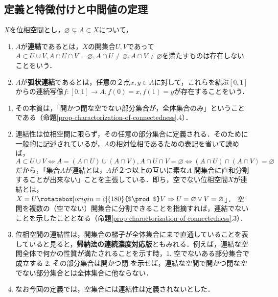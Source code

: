 \documentclass[uplatex,dvipdfmx]{jsreport}
\begin{document}
\subsection{定義と特徴付けと中間値の定理}

\begin{definition}[connected]\label{def-連結性}
    $X$を位相空間とし，$\varnothing\subsetneq A\subset X$について，
    \begin{enumerate}
        \item $A$が\textbf{連結}であるとは，$X$の開集合$U,V$であって$A\subset U\cup V,A\cap U\cap V=\varnothing, A\cap U\ne\varnothing, A\cap V\ne\varnothing$を満たすものは存在しないことをいう．
        \item $A$が\textbf{弧状連結}であるとは，任意の２点$x,y\in A$に対して，これらを結ぶ$[0,1]$からの連続写像$f:[0,1]\to A, f(0)=x, f(1)=y$が存在することをいう．
    \end{enumerate}
\end{definition}
\begin{remark}[連結性とは何か]\mbox{}
    \begin{enumerate}
        \item その本質は，「開かつ閉な空でない部分集合が，全体集合のみ」ということである（命題\ref{prop-charactorization-of-connectedness}.4）．
        \item 連結性は位相空間に限らず，その任意の部分集合に定義される．そのために一般的に記述されているが，$A$の相対位相であるための表記を省いて読めば，$A\subset U\cup V\Leftrightarrow A=(A\cap U)\cup(A\cap V), A\cap U\cap V=\varnothing\Leftrightarrow (A\cap U)\cap(A\cap V)=\varnothing$だから，「集合$A$が連結とは，$A$が２つ以上の互いに素な$A$-開集合に直和分割することが出来ない」ことを主張している．即ち，空でない位相空間$X$が連結とは，$X=U\rotatebox[origin=c]{180}{$\prod$}V\Rightarrow U=\varnothing\lor V=\varnothing$」．
        空間を複数の（空でない）開集合に分割できることを指摘すれば，連結でないことを示したこととなる（命題\ref{prop-charactorization-of-connectedness}.3）．
        \item 位相空間の連結性は，開集合の梯子が全体集合にまで直通していることを表していると見ると，\textbf{帰納法の連続濃度対応版}ともみれる．例えば，連結な空間全体で何かの性質が満たされることを示す時，1. 空でないある部分集合で成立する 2. その部分集合は開かつ閉 を示せば，連結な空間で開かつ閉な空でない部分集合とは全体集合に他ならない．
        \item なお今回の定義では，空集合には連結性は定義されないとした．
    \end{enumerate}
\end{remark}
\end{document}
